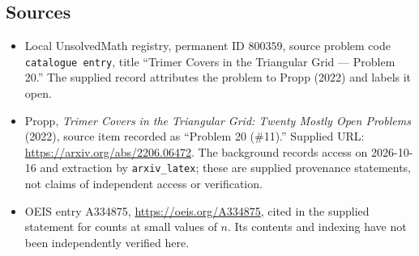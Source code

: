 \documentclass[11pt]{article}
\begin{document}
\subsection{Sources}
\begin{itemize}
\item Local UnsolvedMath registry, permanent ID \(800359\), source problem code \texttt{catalogue entry}, title ``Trimer Covers in the Triangular Grid --- Problem 20.'' The supplied record attributes the problem to Propp (2022) and labels it open.
\item Propp, \emph{Trimer Covers in the Triangular Grid: Twenty Mostly Open Problems} (2022), source item recorded as ``Problem 20 (\#11).'' Supplied URL: \url{https://arxiv.org/abs/2206.06472}. The background records access on 2026-10-16 and extraction by \texttt{arxiv\_latex}; these are supplied provenance statements, not claims of independent access or verification.
\item OEIS entry A334875, \url{https://oeis.org/A334875}, cited in the supplied statement for counts at small values of \(n\). Its contents and indexing have not been independently verified here.
\end{itemize}
\end{document}
